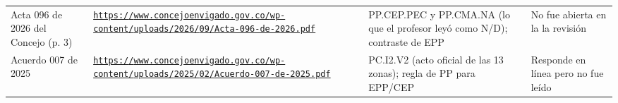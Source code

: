 \documentclass[11pt,letterpaper]{article}
\begin{document}
{\begin{xltabular}{\linewidth}{L{3.6cm}YL{3cm}L{3cm}}
Acta 096 de 2026 del Concejo (p. 3) & \texttt{\footnotesize \href{https://www.concejoenvigado.gov.co/wp-content/uploads/2026/09/Acta-096-de-2026.pdf}{https:/\allowbreak{}}\allowbreak{}\href{https://www.concejoenvigado.gov.co/wp-content/uploads/2026/09/Acta-096-de-2026.pdf}{/\allowbreak{}}\allowbreak{}\href{https://www.concejoenvigado.gov.co/wp-content/uploads/2026/09/Acta-096-de-2026.pdf}{www.\allowbreak{}concejoenvigado.\allowbreak{}gov.\allowbreak{}co/\allowbreak{}}\allowbreak{}\href{https://www.concejoenvigado.gov.co/wp-content/uploads/2026/09/Acta-096-de-2026.pdf}{wp-\allowbreak{}content/\allowbreak{}}\allowbreak{}\href{https://www.concejoenvigado.gov.co/wp-content/uploads/2026/09/Acta-096-de-2026.pdf}{uploads/\allowbreak{}}\allowbreak{}\href{https://www.concejoenvigado.gov.co/wp-content/uploads/2026/09/Acta-096-de-2026.pdf}{2026/\allowbreak{}}\allowbreak{}\href{https://www.concejoenvigado.gov.co/wp-content/uploads/2026/09/Acta-096-de-2026.pdf}{09/\allowbreak{}}\allowbreak{}\href{https://www.concejoenvigado.gov.co/wp-content/uploads/2026/09/Acta-096-de-2026.pdf}{Acta-\allowbreak{}096-\allowbreak{}de-\allowbreak{}2026.\allowbreak{}pdf}} & PP.CEP.PEC y PP.CMA.NA (lo que el profesor leyó como N/D); contraste de EPP & No fue abierta en la la revisión \\
Acuerdo 007 de 2025 & \texttt{\footnotesize \href{https://www.concejoenvigado.gov.co/wp-content/uploads/2025/02/Acuerdo-007-de-2025.pdf}{https:/\allowbreak{}}\allowbreak{}\href{https://www.concejoenvigado.gov.co/wp-content/uploads/2025/02/Acuerdo-007-de-2025.pdf}{/\allowbreak{}}\allowbreak{}\href{https://www.concejoenvigado.gov.co/wp-content/uploads/2025/02/Acuerdo-007-de-2025.pdf}{www.\allowbreak{}concejoenvigado.\allowbreak{}gov.\allowbreak{}co/\allowbreak{}}\allowbreak{}\href{https://www.concejoenvigado.gov.co/wp-content/uploads/2025/02/Acuerdo-007-de-2025.pdf}{wp-\allowbreak{}content/\allowbreak{}}\allowbreak{}\href{https://www.concejoenvigado.gov.co/wp-content/uploads/2025/02/Acuerdo-007-de-2025.pdf}{uploads/\allowbreak{}}\allowbreak{}\href{https://www.concejoenvigado.gov.co/wp-content/uploads/2025/02/Acuerdo-007-de-2025.pdf}{2025/\allowbreak{}}\allowbreak{}\href{https://www.concejoenvigado.gov.co/wp-content/uploads/2025/02/Acuerdo-007-de-2025.pdf}{02/\allowbreak{}}\allowbreak{}\href{https://www.concejoenvigado.gov.co/wp-content/uploads/2025/02/Acuerdo-007-de-2025.pdf}{Acuerdo-\allowbreak{}007-\allowbreak{}de-\allowbreak{}2025.\allowbreak{}pdf}} & PC.I2.V2 (acto oficial de las 13 zonas); regla de PP para EPP/CEP & Responde en línea pero no fue leído \\

\end{xltabular}}
\end{document}
